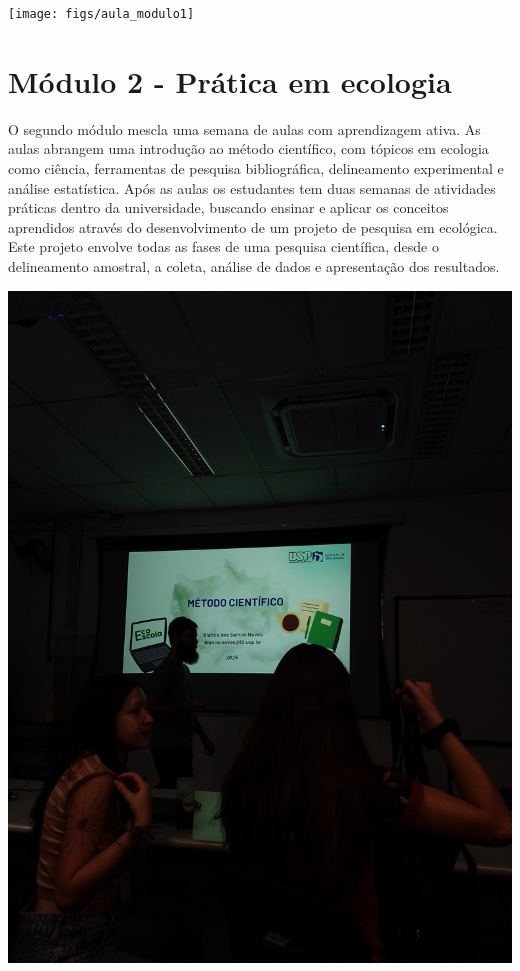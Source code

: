 \documentclass[
]{book}
\begin{document}
\begin{center}\texttt{[image: figs/aula\_modulo1]} \end{center}

\section{Módulo 2 - Prática em ecologia}\label{muxf3dulo-2---pruxe1tica-em-ecologia}

O segundo módulo mescla uma semana de aulas com aprendizagem ativa. As aulas abrangem uma introdução ao método científico, com tópicos em ecologia como ciência, ferramentas de pesquisa bibliográfica, delineamento experimental e análise estatística. Após as aulas os estudantes tem duas semanas de atividades práticas dentro da universidade, buscando ensinar e aplicar os conceitos aprendidos através do desenvolvimento de um projeto de pesquisa em ecológica. Este projeto envolve todas as fases de uma pesquisa científica, desde o delineamento amostral, a coleta, análise de dados e apresentação dos resultados.

\begin{center}\includegraphics[width=0.9\linewidth]{figs/aula_modulo2} \end{center}
\end{document}
